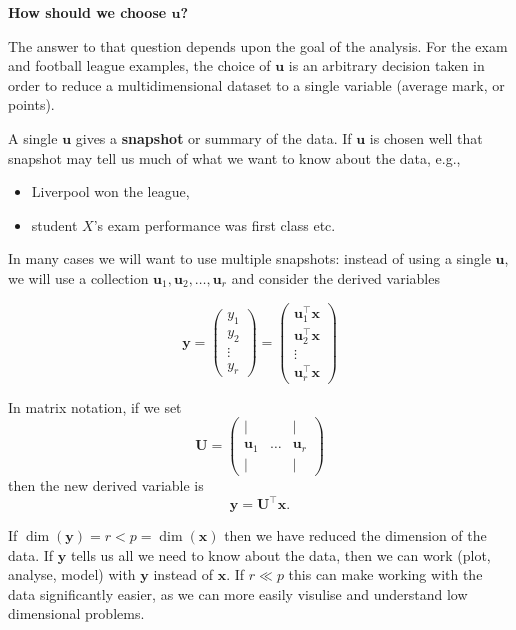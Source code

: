 \documentclass[]{book}
\providecommand{\tightlist}{%
  \setlength{\itemsep}{0pt}\setlength{\parskip}{0pt}}
\theoremstyle{definition}
\theoremstyle{definition}
\theoremstyle{definition}
\theoremstyle{remark}
\begin{document}
\textbf{How should we choose \(\boldsymbol u\)?}

The answer to that question depends upon the goal of the analysis. For the exam and football league examples, the choice of \(\boldsymbol u\) is an arbitrary decision taken in order to reduce a multidimensional dataset to a single variable (average mark, or points).

A single \(\boldsymbol u\) gives a \textbf{snapshot} or summary of the data. If \(\boldsymbol u\) is chosen well that snapshot may tell us much of what we want to know about the data, e.g.,

\begin{itemize}
\tightlist
\item
  Liverpool won the league,
\item
  student \(X\)'s exam performance was first class etc.
\end{itemize}

In many cases we will want to use multiple snapshots: instead of using a single \(\boldsymbol u\), we will use a collection \(\boldsymbol u_1, \boldsymbol u_2, \ldots, \boldsymbol u_r\) and consider the derived variables

\[\boldsymbol y= \begin{pmatrix} y_1\\y_2 \\ \vdots \\ y_r\end{pmatrix} = \begin{pmatrix}
\boldsymbol u_1^\top \boldsymbol x\\  \boldsymbol u_2^\top \boldsymbol x\\\vdots\\  \boldsymbol u_r^\top \boldsymbol x\end{pmatrix}\]

In matrix notation, if we set
\[\boldsymbol U= \begin{pmatrix} 
|&&|\\
\boldsymbol u_1 & \ldots & \boldsymbol u_r\\
|&&|\end{pmatrix}\]
then the new derived variable is
\[\boldsymbol y= \boldsymbol U^\top \boldsymbol x.\]

If \(\dim(\boldsymbol y)=r<p=\dim(\boldsymbol x)\) then we have reduced the dimension of the data. If \(\boldsymbol y\) tells us all we need to know about the data, then we can work (plot, analyse, model) with \(\boldsymbol y\) instead of \(\boldsymbol x\). If \(r\ll p\) this can make working with the data significantly easier, as we can more easily visulise and understand low dimensional problems.
\end{document}
